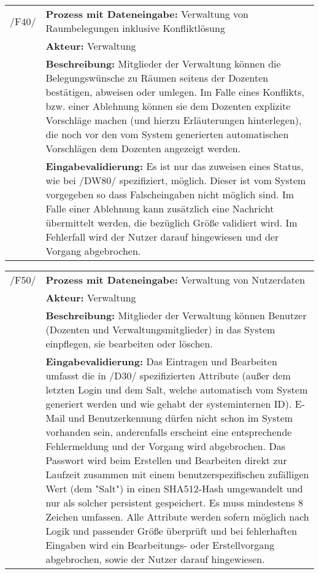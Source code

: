 \begin{tabular}{p{1.5cm}p{14.5cm}}
		
	 /F40/ & \textbf{Prozess mit Dateneingabe:} Verwaltung von Raumbelegungen inklusive Konfliktlösung \\
				& \textbf{Akteur:} Verwaltung \\
				& \textbf{Beschreibung:} Mitglieder der Verwaltung können die Belegungswünsche zu Räumen seitens der Dozenten bestätigen, abweisen oder umlegen. Im Falle eines Konflikts, bzw. einer Ablehnung können sie dem Dozenten explizite Vorschläge machen (und hierzu Erläuterungen hinterlegen), die noch vor den vom System generierten automatischen Vorschlägen dem Dozenten angezeigt werden. \\
				& \textbf{Eingabevalidierung:} Es ist nur das zuweisen eines Status, wie bei /DW80/ spezifiziert, möglich. Dieser ist vom System vorgegeben so dass Falscheingaben nicht möglich sind. Im Falle einer Ablehnung kann zusätzlich eine Nachricht übermittelt werden, die bezüglich Größe validiert wird. Im Fehlerfall wird der Nutzer darauf hingewiesen und der Vorgang abgebrochen.\\[0.25cm]

\end{tabular}


\begin{tabular}{p{1.5cm}p{14.5cm}}
	
	 /F50/	& \textbf{Prozess mit Dateneingabe:} Verwaltung von Nutzerdaten \\
				& \textbf{Akteur:} Verwaltung \\
				& \textbf{Beschreibung:} Mitglieder der Verwaltung können Benutzer (Dozenten und Verwaltungsmitglieder) in das System einpflegen, sie bearbeiten oder löschen. \\
				& \textbf{Eingabevalidierung:} Das Eintragen und Bearbeiten umfasst die in /D30/ spezifizierten Attribute (außer dem letzten Login und dem Salt, welche automatisch vom System generiert werden und wie gehabt der systeminternen ID). E-Mail und Benutzerkennung dürfen nicht schon im System vorhanden sein, anderenfalls erscheint eine entsprechende Fehlermeldung und der Vorgang wird abgebrochen. Das Passwort wird beim Erstellen und Bearbeiten direkt zur Laufzeit zusammen mit einem benutzerspezifischen zufälligen Wert (dem "Salt") in einen SHA512-Hash umgewandelt und nur als solcher persistent gespeichert. Es muss mindestens 8 Zeichen umfassen. Alle Attribute werden sofern möglich nach Logik und passender Größe überprüft und bei fehlerhaften Eingaben wird ein Bearbeitungs- oder Erstellvorgang abgebrochen, sowie der Nutzer darauf hingewiesen.\\[0.25cm]

\end{tabular}


